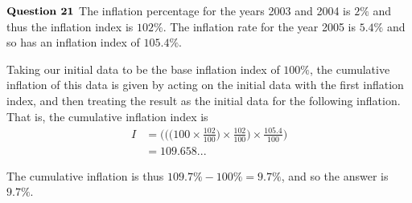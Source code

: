 \documentclass{article}
\begin{document}
$\textbf{Question 21} \\$
The inflation percentage for the years 2003 and 2004 is $2\%$ and thus the inflation index is $102\%$. The inflation rate for the year 2005 is $5.4\%$ and so has an inflation index of $105.4\%$.

Taking our initial data to be the base inflation index of $100\%$, the cumulative inflation of this data is given by acting on the initial data with the first inflation index, and then treating the result as the initial data for the following inflation. That is, the cumulative inflation index is
\begin{align*}
    I &= \bigg( \bigg( \bigg(100 \times \frac{102}{100} \bigg) \times \frac{102}{100} \bigg) \times \frac{105.4}{100} \bigg)\\
    &=109.658...
\end{align*}

The cumulative inflation is thus $109.7\%-100\%=9.7\%$, and so the answer is $9.7\%$.
\end{document}
